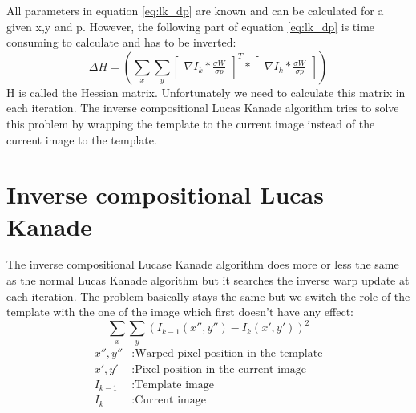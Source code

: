 \documentclass[11pt,a4paper,titlepage,oneside]{report}
\begin{document}
All parameters in equation \ref{eq:lk_dp} are known and can be calculated for a given x,y and p. However, the following part of equation \ref{eq:lk_dp} is time consuming to calculate and has to be inverted:
\begin{equation}
	\Delta H=(\sum_x\sum_y\begin{bmatrix}\nabla I_{k}*\frac{\sigma W}{\sigma p}\end{bmatrix}^T*\begin{bmatrix}\nabla I_{k}*\frac{\sigma W}{\sigma p}\end{bmatrix})
\end{equation}
H is called the Hessian matrix. Unfortunately we need to calculate this matrix in each iteration. The inverse compositional Lucas Kanade algorithm tries to solve this problem by wrapping the template to the current image instead of the current image to the template.

\section{Inverse compositional Lucas Kanade}

The inverse compositional Lucase Kanade algorithm does more or less the same as the normal Lucas Kanade algorithm but it searches the inverse warp update at each iteration. The problem basically stays the same but we switch the role of the template with the one of the image which first doesn't have any effect:
\begin{equation}\label{eq:iclk_problem}
	\sum_x\sum_y(I_{k-1}(x'',y'')-I_{k}(x',y'))^2
\end{equation}
\begin{align*}
	x'',y''		&:	\text{Warped pixel position in the template}\\
	x',y'			&:	\text{Pixel position in the current image}\\
	I_{k-1}		&:	\text{Template image}\\
	I_{k}			&:	\text{Current image}
\end{align*}
\end{document}
